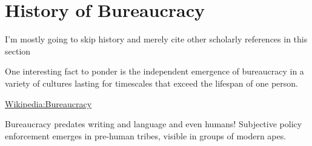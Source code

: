 \section{History of Bureaucracy}

I'm mostly going to skip history and merely cite other scholarly references in this section

One interesting fact to ponder is the independent emergence of bureaucracy in a variety of cultures lasting for timescales that exceed the lifespan of one person. 

\href{https://en.wikipedia.org/wiki/Bureaucracy}{Wikipedia:Bureaucracy}

Bureaucracy predates writing and language and even humans! Subjective policy enforcement emerges in pre-human tribes, visible in groups of modern apes. 